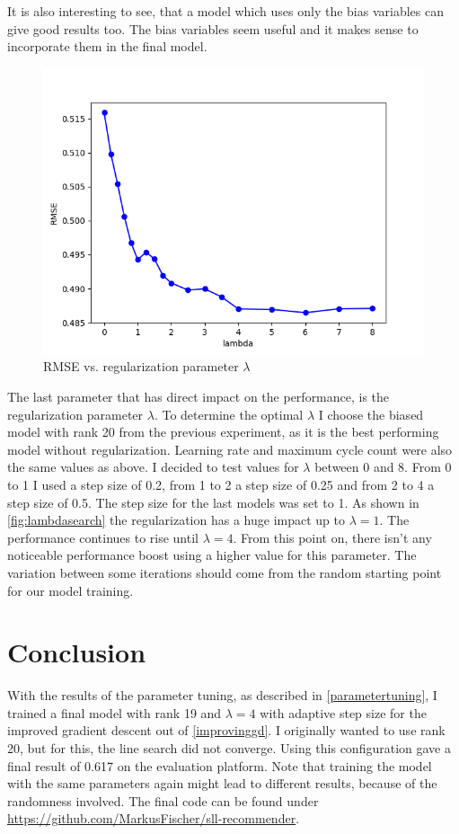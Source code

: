 \documentclass[DIV=14,twocolumn]{scrartcl}
\begin{document}
It is also interesting to see, that a model which uses only the bias variables can give good results too. The bias variables seem useful and it makes sense to incorporate them in the final model.
\begin{figure}[h]
	\includegraphics[width=\columnwidth]{../img/lambda-rmse-validate}
	\caption{RMSE vs. regularization parameter $\lambda$}
	\label{fig:lambdasearch}
\end{figure}

The last parameter that has direct impact on the performance, is the regularization parameter $\lambda$. To determine the optimal $\lambda$ I choose the biased model with rank 20 from the previous experiment, as it is the best performing model without regularization. Learning rate and maximum cycle count were also the same values as above. 
I decided to test values for $\lambda$ between 0 and 8. From 0 to 1 I used a step size of 0.2, from 1 to 2 a step size of 0.25 and from 2 to 4 a step size of 0.5. The step size for the last models was set to 1. As shown in \autoref{fig:lambdasearch} the regularization has a huge impact up to  $\lambda=1$. The performance continues to rise until $\lambda=4$. From this point on, there isn't any noticeable performance boost using a higher value for this parameter. 
The variation between some iterations should come from the random starting point for our model training. 
\section{Conclusion}
With the results of the parameter tuning, as described in \autoref{parametertuning}, I trained a final model with rank 19 and $\lambda=4$ with adaptive step size for the improved gradient descent out of \autoref{improvinggd}. I originally wanted to use rank 20, but for this, the line search did not converge. 
Using this configuration gave a final result of 0.617 on the evaluation platform. Note that training the model with the same parameters again might lead to different results, because of the randomness involved. The final code can be found under \url{https://github.com/MarkusFischer/sll-recommender}. 
\end{document}
